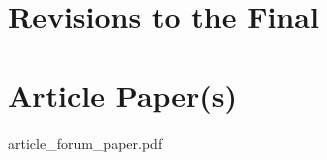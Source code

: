 	\chapter{Revisions to the Final} 
	\label{ch:revisions_to_the_final}
	
	\cleardoublepage
	
	
	\ifPubList
	
	\fi
	\cleardoublepage
	
	\ifVita
	
	\fi
	\cleardoublepage
	
	\ifIndex
	\printindex
	\fi
	
	\chapter{Article Paper(s)} 
	\label{ch:article_paper}
	\cleardoublepage
	{
	\ClearWallPaper
	
	{article_forum_paper.pdf}
	}
	\cleardoublepage


